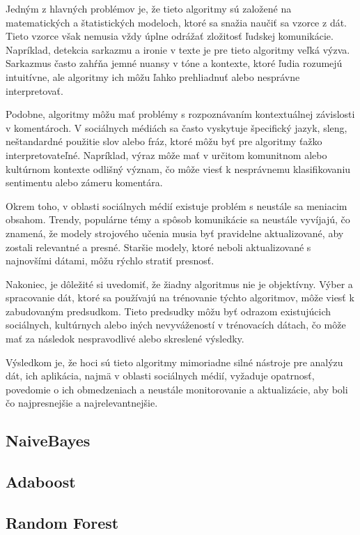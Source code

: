 \documentclass[12pt,twoside,slovak,a4paper]{article}
\begin{document}
Jedným z hlavných problémov je, že tieto algoritmy sú založené na matematických a štatistických modeloch, ktoré sa snažia naučiť sa vzorce z dát. Tieto vzorce však nemusia vždy úplne odrážať zložitosť ľudskej komunikácie. Napríklad, detekcia sarkazmu a ironie v texte je pre tieto algoritmy veľká výzva. Sarkazmus často zahŕňa jemné nuansy v tóne a kontexte, ktoré ľudia rozumejú intuitívne, ale algoritmy ich môžu ľahko prehliadnuť alebo nesprávne interpretovať.

Podobne, algoritmy môžu mať problémy s rozpoznávaním kontextuálnej závislosti v komentároch. V sociálnych médiách sa často vyskytuje špecifický jazyk, sleng, neštandardné použitie slov alebo fráz, ktoré môžu byť pre algoritmy ťažko interpretovateľné. Napríklad, výraz môže mať v určitom komunitnom alebo kultúrnom kontexte odlišný význam, čo môže viesť k nesprávnemu klasifikovaniu sentimentu alebo zámeru komentára.

Okrem toho, v oblasti sociálnych médií existuje problém s neustále sa meniacim obsahom. Trendy, populárne témy a spôsob komunikácie sa neustále vyvíjajú, čo znamená, že modely strojového učenia musia byť pravidelne aktualizované, aby zostali relevantné a presné. Staršie modely, ktoré neboli aktualizované s najnovšími dátami, môžu rýchlo stratiť presnosť.

Nakoniec, je dôležité si uvedomiť, že žiadny algoritmus nie je objektívny. Výber a spracovanie dát, ktoré sa používajú na trénovanie týchto algoritmov, môže viesť k zabudovaným predsudkom. Tieto predsudky môžu byť odrazom existujúcich sociálnych, kultúrnych alebo iných nevyvážeností v trénovacích dátach, čo môže mať za následok nespravodlivé alebo skreslené výsledky.

Výsledkom je, že hoci sú tieto algoritmy mimoriadne silné nástroje pre analýzu dát, ich aplikácia, najmä v oblasti sociálnych médií, vyžaduje opatrnosť, povedomie o ich obmedzeniach a neustále monitorovanie a aktualizácie, aby boli čo najpresnejšie a najrelevantnejšie.

\subsection{NaiveBayes\cite{7809906}}

\subsection{Adaboost\cite{7087040}}

\subsection{Random Forest\cite{9952138}}
\end{document}
